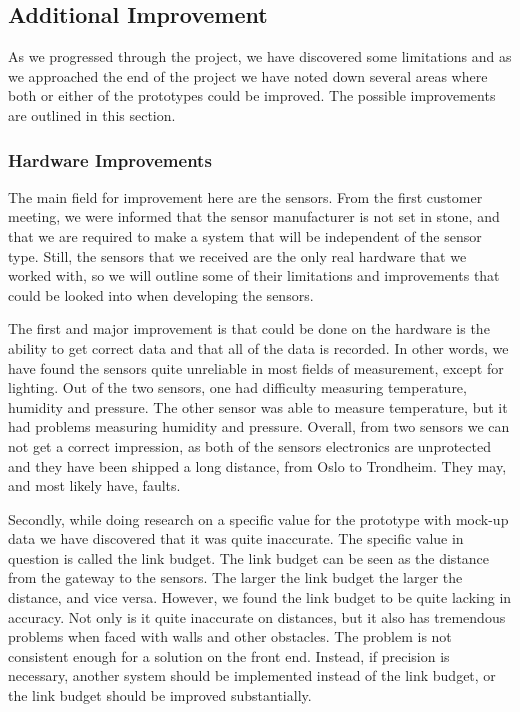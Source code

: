 \documentclass[../document]{subfiles}
\begin{document}
\subsection{Additional Improvement}
As we progressed through the project, we have discovered some limitations and as we approached the end of the project we have noted down several areas where both or either of the prototypes could be improved. The possible improvements are outlined in this section.

\subsubsection{Hardware Improvements}
The main field for improvement here are the sensors. From the first customer meeting, we were informed that the sensor manufacturer is not set in stone, and that we are required to make a system that will be independent of the sensor type. Still, the sensors that we received are the only real hardware that we worked with, so we will outline some of their limitations and improvements that could be looked into when developing the sensors. 

The first and major improvement is that could be done on the hardware is the ability to get correct data and that all of the data is recorded. In other words, we have found the sensors quite unreliable in most fields of measurement, except for lighting. Out of the two sensors, one had difficulty measuring temperature, humidity and pressure. The other sensor was able to measure temperature, but it had problems measuring humidity and pressure. Overall, from two sensors we can not get a correct impression, as both of the sensors electronics are unprotected and they have been shipped a long distance, from Oslo to Trondheim. They may, and most likely have, faults.

Secondly, while doing research on a specific value for the prototype with mock-up data we have discovered that it was quite inaccurate. The specific value in question is called the link budget. The link budget can be seen as the distance from the gateway to the sensors. The larger the link budget the larger the distance, and vice versa. However, we found the link budget to be quite lacking in accuracy. Not only is it quite inaccurate on distances, but it also has tremendous problems when faced with walls and other obstacles. The problem is not consistent enough for a solution on the front end. Instead, if precision is necessary, another system should be implemented instead of the link budget, or the link budget should be improved substantially. 
\end{document}
